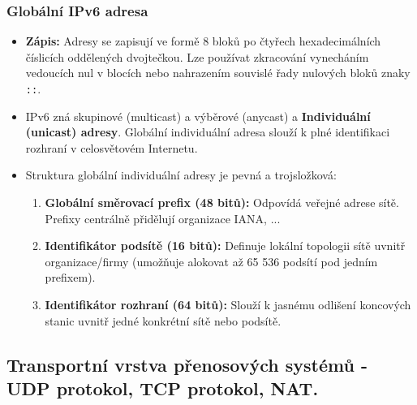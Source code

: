     \subsubsection{Globální IPv6 adresa}
        \begin{itemize}
            \item \textbf{Zápis:} Adresy se zapisují ve formě 8 bloků po čtyřech hexadecimálních číslicích oddělených dvojtečkou. Lze používat zkracování vynecháním vedoucích nul v blocích nebo nahrazením souvislé řady nulových bloků znaky \texttt{::}.
            \item IPv6 zná skupinové (multicast) a výběrové (anycast) a \textbf{Individuální (unicast) adresy}. Globální individuální adresa slouží k plné identifikaci rozhraní v celosvětovém Internetu.
            \item Struktura globální individuální adresy je pevná a trojsložková:
            \begin{enumerate}
                \item \textbf{Globální směrovací prefix (48 bitů):} Odpovídá veřejné adrese sítě. Prefixy centrálně přidělují organizace IANA, ...
                \item \textbf{Identifikátor podsítě (16 bitů):} Definuje lokální topologii sítě uvnitř organizace/firmy (umožňuje alokovat až 65 536 podsítí pod jedním prefixem).
                \item \textbf{Identifikátor rozhraní (64 bitů):} Slouží k jasnému odlišení koncových stanic uvnitř jedné konkrétní sítě nebo podsítě.
            \end{enumerate}
        \end{itemize}
\subsection{Transportní vrstva přenosových systémů - UDP protokol, TCP protokol, NAT. }
